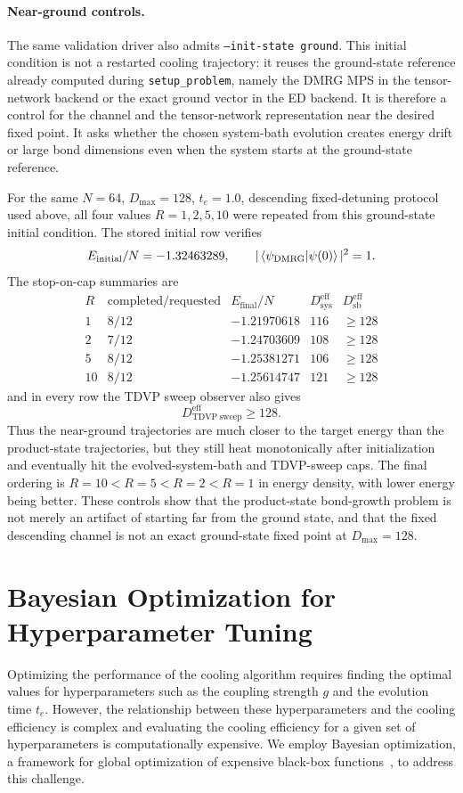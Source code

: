 \documentclass[aps,pra,twocolumn,superscriptaddress,nolongbibliography,nobalancelastpage,10pt]{revtex4-2}
\begin{document}
\paragraph{Near-ground controls.}
The same validation driver also admits \texttt{--init-state ground}.  This
initial condition is not a restarted cooling trajectory: it reuses the
ground-state reference already computed during \texttt{setup\_problem}, namely
the DMRG MPS in the tensor-network backend or the exact ground vector in the
ED backend.  It is therefore a control for the channel and the tensor-network
representation near the desired fixed point.  It asks whether the chosen
system-bath evolution creates energy drift or large bond dimensions even when
the system starts at the ground-state reference.

For the same \(N=64\), \(D_{\max}=128\), \(t_e=1.0\), descending fixed-detuning
protocol used above, all four values \(R=1,2,5,10\) were repeated from this
ground-state initial condition.  The stored initial row verifies
\[
	E_{\mathrm{initial}}/N=-1.32463289,\qquad
	|\braket{\psi_{\mathrm{DMRG}}|\psi(0)}|^2=1 .
\]
The stop-on-cap summaries are
\[
\begin{array}{c|c|c|c|c}
R & \text{completed/requested} & E_{\mathrm{final}}/N
  & D_{\mathrm{sys}}^{\mathrm{eff}}
  & D_{\mathrm{sb}}^{\mathrm{eff}}\\
\hline
1 & 8/12 & -1.21970618 & 116 & \geq 128\\
2 & 7/12 & -1.24703609 & 108 & \geq 128\\
5 & 8/12 & -1.25381271 & 106 & \geq 128\\
10 & 8/12 & -1.25614747 & 121 & \geq 128
\end{array}
\]
and in every row the TDVP sweep observer also gives
\[
	D_{\mathrm{TDVP\ sweep}}^{\mathrm{eff}}\geq 128 .
\]
Thus the near-ground trajectories are much closer to the target energy than the
product-state trajectories, but they still heat monotonically after
initialization and eventually hit the evolved-system-bath and TDVP-sweep caps.
The final ordering is \(R=10<R=5<R=2<R=1\) in energy density, with lower energy
being better.  These controls show that the product-state bond-growth problem
is not merely an artifact of starting far from the ground state, and that the
fixed descending channel is not an exact ground-state fixed point at
\(D_{\max}=128\).

\section{Bayesian Optimization for Hyperparameter Tuning}
Optimizing the performance of the cooling algorithm requires finding the optimal values for hyperparameters such as the coupling strength $g$ and the evolution time $t_e$. However, the relationship between these hyperparameters and the cooling efficiency is complex and evaluating the cooling efficiency for a given set of hyperparameters is computationally expensive. We employ Bayesian optimization, a framework for global optimization of expensive black-box functions~\cite{Frazier2018Tutorial}, to address this challenge.
\end{document}
